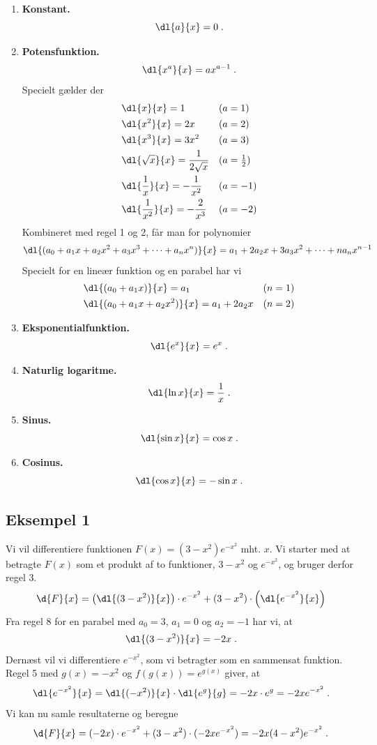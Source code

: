 \begin{enumerate}[resume]
\item\label{itm:d-konstant} \textbf{Konstant.}\\
  \[
  \dl{a}{x} = 0 \; .
  \]
\item\label{itm:d-potens} \textbf{Potensfunktion.}\\
  \[
  \dl{x^a}{x} = a x^{a-1} \; .
  \]
  Specielt gælder der
  \begin{align*}
    &\dl{x}{x} = 1 &&(a=1)\\
    &\dl{x^2}{x} = 2 x &&(a=2)\\
    &\dl{x^3}{x} = 3 x^2 &&(a=3)\\
    &\dl{\sqrt{x}}{x} = \frac{1}{2\sqrt{x}} &&(a=\tfrac{1}{2})\\
    &\dl{\frac{1}{x}}{x} = - \frac{1}{x^2} &&(a=-1)\\
    &\dl{\frac{1}{x^2}}{x} = - \frac{2}{x^3} &&(a=-2)
  \end{align*}
  Kombineret med regel 1 og 2, får man for polynomier
  \[
  \dl{(a_0 + a_1 x + a_2 x^2 + a_3 x^3 + \dots + a_n x^n)}{x}
  = a_1 + 2a_2 x + 3a_3 x^2 + \dots + na_n x^{n-1}
  \]
  Specielt for en lineær funktion og en parabel har vi
  \begin{align*}
    &\dl{ (a_0 + a_1 x) }{x} = a_1 && (n=1)\\
    &\dl{ (a_0 + a_1 x + a_2 x^2) }{x} = a_1 + 2a_2 x && (n=2)
  \end{align*}
\item\label{itm:d-exp} \textbf{Eksponentialfunktion.}\\
  \[
  \dl{e^x}{x} = e^x \; .
  \]
\item\label{itm:d-ln} \textbf{Naturlig logaritme.}\\
  \[
  \dl{\ln x}{x} = \frac{1}{x} \; .
  \]
\item\label{itm:d-sin} \textbf{Sinus.}\\
  \[
  \dl{\sin x}{x} = \cos x \; .
  \]
\item\label{itm:d-cos} \textbf{Cosinus.}\\
  \[
  \dl{\cos x}{x} = - \sin x \; .
  \]
\end{enumerate}

\subsection{Eksempel 1}
Vi vil differentiere funktionen $F(x) = (3 - x^2) e^{-x^2}$
mht. $x$. Vi starter med at betragte $F(x)$ som et produkt af to
funktioner, $3-x^2$ og $e^{-x^2}$, og bruger derfor regel 3.
\[
\d{F}{x} =
\left(\dl{(3-x^2)}{x}\right) \cdot e^{-x^2}
+ (3-x^2) \cdot \left(\dl{e^{-x^2}}{x}\right)
\]
Fra regel 8 for en parabel med $a_0 = 3$, $a_1 = 0$ og $a_2 = -1$ har vi, at
\[
\dl{(3-x^2)}{x} = -2x \; .
\]
Dernæst vil vi differentiere $e^{-x^2}$, som vi betragter som en
sammensat funktion. Regel 5 med $g(x) = -x^2$ og $f(g(x)) = e^{g(x)}$
giver, at
\[
\dl{e^{-x^2}}{x} = \dl{(-x^2)}{x} \cdot \dl{e^g}{g}
= -2x \cdot e^g
= -2x e^{-x^2} \; .
\]
Vi kan nu samle resultaterne og beregne
\[
\d{F}{x} = (-2x) \cdot e^{-x^2} + (3-x^2) \cdot (-2x e^{-x^2})
= -2x(4 - x^2) e^{-x^2} \; .
\]

